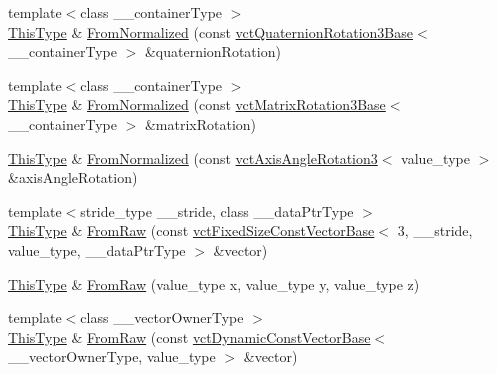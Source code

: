 \begin{DoxyCompactItemize}
\item 
{\footnotesize template$<$class \-\_\-\-\_\-container\-Type $>$ }\\\hyperlink{classvct_rodriguez_rotation3_base_add2bccab7f6e86c98b3f97fd00b06dcc}{This\-Type} \& \hyperlink{classvct_rodriguez_rotation3_base_a9bbc2e37b3687fcc9d45e68e1f49b588}{From\-Normalized} (const \hyperlink{classvct_quaternion_rotation3_base}{vct\-Quaternion\-Rotation3\-Base}$<$ \-\_\-\-\_\-container\-Type $>$ \&quaternion\-Rotation)
\item 
{\footnotesize template$<$class \-\_\-\-\_\-container\-Type $>$ }\\\hyperlink{classvct_rodriguez_rotation3_base_add2bccab7f6e86c98b3f97fd00b06dcc}{This\-Type} \& \hyperlink{classvct_rodriguez_rotation3_base_a1a9a12522ff3e0a0c2a0774845ee8122}{From\-Normalized} (const \hyperlink{classvct_matrix_rotation3_base}{vct\-Matrix\-Rotation3\-Base}$<$ \-\_\-\-\_\-container\-Type $>$ \&matrix\-Rotation)
\item 
\hyperlink{classvct_rodriguez_rotation3_base_add2bccab7f6e86c98b3f97fd00b06dcc}{This\-Type} \& \hyperlink{classvct_rodriguez_rotation3_base_a5e9fe66b636e0004dc7258c3779bb578}{From\-Normalized} (const \hyperlink{classvct_axis_angle_rotation3}{vct\-Axis\-Angle\-Rotation3}$<$ value\-\_\-type $>$ \&axis\-Angle\-Rotation)
\item 
{\footnotesize template$<$stride\-\_\-type \-\_\-\-\_\-stride, class \-\_\-\-\_\-data\-Ptr\-Type $>$ }\\\hyperlink{classvct_rodriguez_rotation3_base_add2bccab7f6e86c98b3f97fd00b06dcc}{This\-Type} \& \hyperlink{classvct_rodriguez_rotation3_base_aec3c2b4ac5cfc2302620bd5ce61caafc}{From\-Raw} (const \hyperlink{classvct_fixed_size_const_vector_base}{vct\-Fixed\-Size\-Const\-Vector\-Base}$<$ 3, \-\_\-\-\_\-stride, value\-\_\-type, \-\_\-\-\_\-data\-Ptr\-Type $>$ \&vector)
\item 
\hyperlink{classvct_rodriguez_rotation3_base_add2bccab7f6e86c98b3f97fd00b06dcc}{This\-Type} \& \hyperlink{classvct_rodriguez_rotation3_base_a4c04d695f509f7e6bd94478537982af6}{From\-Raw} (value\-\_\-type x, value\-\_\-type y, value\-\_\-type z)
\item 
{\footnotesize template$<$class \-\_\-\-\_\-vector\-Owner\-Type $>$ }\\\hyperlink{classvct_rodriguez_rotation3_base_add2bccab7f6e86c98b3f97fd00b06dcc}{This\-Type} \& \hyperlink{classvct_rodriguez_rotation3_base_ac2f626adaa2104ec45a1211e31cffa79}{From\-Raw} (const \hyperlink{classvct_dynamic_const_vector_base}{vct\-Dynamic\-Const\-Vector\-Base}$<$ \-\_\-\-\_\-vector\-Owner\-Type, value\-\_\-type $>$ \&vector)

\end{DoxyCompactItemize}
